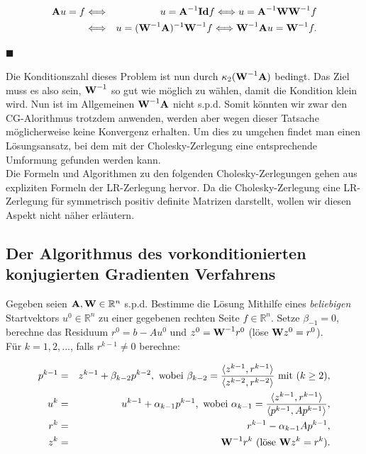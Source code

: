 \begin{eqnarray}
{\textbf{A}}u = f &\Longleftrightarrow& u = {\textbf{A}}^{-1} {\textbf{Id}} f \Longleftrightarrow u = {\textbf{A}}^{-1} {\textbf{W}} {\textbf{W}}^{-1} f \notag \\
&\Longleftrightarrow& u = ({\textbf{W}}^{-1} {\textbf{A}})^{-1} {\textbf{W}}^{-1} f \Longleftrightarrow {\textbf{W}}^{-1} {\textbf{A}} u = {\textbf{W}}^{-1} f. \notag
\end{eqnarray}
\begin{flushright}
$\blacksquare$
\end{flushright}

Die Konditionszahl dieses Problem ist nun durch $\kappa_{2}({\textbf{W}}^{-1}{\textbf{A}})$ bedingt. Das Ziel muss es also sein, ${\textbf{W}}^{-1}$ so gut wie möglich zu wählen, damit die Kondition klein wird. Nun ist im Allgemeinen ${\textbf{W}}^{-1}{\textbf{A}}$ nicht s.p.d. Somit könnten wir zwar den CG-Alorithmus trotzdem anwenden, werden aber wegen dieser Tatsache möglicherweise keine Konvergenz erhalten. Um dies zu umgehen findet man einen Lösungsansatz, bei dem mit der Cholesky-Zerlegung eine entsprechende Umformung gefunden werden kann.\\
Die Formeln und Algorithmen zu den folgenden Cholesky-Zerlegungen gehen aus expliziten Formeln der LR-Zerlegung hervor. Da die Cholesky-Zerlegung eine LR-Zerlegung für symmetrisch positiv definite Matrizen darstellt, wollen wir diesen Aspekt nicht näher erläutern.

\subsection{Der Algorithmus des vorkonditionierten konjugierten Gradienten Verfahrens}\label{ss.Algorithmus PCG}

Gegeben seien ${\textbf{A}}, {\textbf{W}} \in \mathbb{R}^{n}$ s.p.d. Bestimme die Lösung Mithilfe eines \textit{beliebigen} Startvektors $u^{0} \in \mathbb{R}^{n}$ zu einer gegebenen rechten Seite $f \in \mathbb{R}^{n}$. Setze $\beta_{-1} = 0$, berechne das Residuum $r^{0} = b - Au^{0}$ und $z^{0} = {\textbf{W}}^{-1}r^{0}$ (löse ${\textbf{W}}z^{0} = r^{0}$).\\
Für $k = 1,2,...$, falls $r^{k-1} \ne 0$ berechne:

\begin{eqnarray}
p^{k-1} &=& z^{k-1} + \beta_{k-2}p^{k-2}, \textnormal{ wobei } \beta_{k-2} = \frac {\langle z^{k-1}, r^{k-1} \rangle} {\langle z^{k-2}, r^{k-2} \rangle} \textnormal{ mit } (k \ge 2), \notag \\
u^{k} &=& u^{k-1} + \alpha_{k-1}p^{k-1}, \textnormal{ wobei } \alpha_{k-1} = \frac {\langle z^{k-1}, r^{k-1} \rangle} {\langle p^{k-1}, Ap^{k-1} \rangle}, \notag \\
r^{k} &=& r^{k-1} - \alpha_{k-1}Ap^{k-1}, \notag \\
z^{k} &=& {\textbf{W}}^{-1}r^{k} \textnormal{ (löse } {\textbf{W}}z^{k} = r^{k}). \notag
\end{eqnarray}

